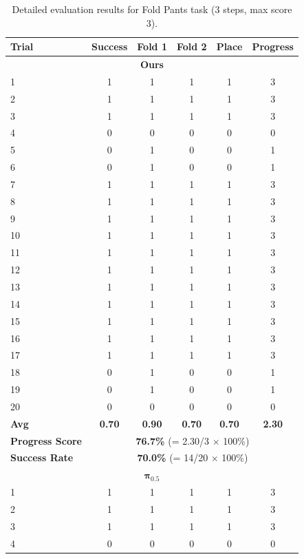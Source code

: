 \documentclass[onecolumn]{robbyant}           %
\begin{document}
\begin{table}[t]
\centering
\caption{Detailed evaluation results for Fold Pants task (3 steps, max score 3).}
\label{tab:realworld_detailed_fold_pants}
\scriptsize
\begin{tabular}{l|c|ccc|c}
\toprule
\textbf{Trial} & \textbf{Success} & \textbf{Fold 1} & \textbf{Fold 2} & \textbf{Place} & \textbf{Progress} \\
\midrule
\multicolumn{6}{c}{\textbf{Ours}} \\
\midrule
1  & 1 & 1 & 1 & 1 & 3 \\
2  & 1 & 1 & 1 & 1 & 3 \\
3  & 1 & 1 & 1 & 1 & 3 \\
4  & 0 & 0 & 0 & 0 & 0 \\
5  & 0 & 1 & 0 & 0 & 1 \\
6  & 0 & 1 & 0 & 0 & 1 \\
7  & 1 & 1 & 1 & 1 & 3 \\
8  & 1 & 1 & 1 & 1 & 3 \\
9  & 1 & 1 & 1 & 1 & 3 \\
10 & 1 & 1 & 1 & 1 & 3 \\
11 & 1 & 1 & 1 & 1 & 3 \\
12 & 1 & 1 & 1 & 1 & 3 \\
13 & 1 & 1 & 1 & 1 & 3 \\
14 & 1 & 1 & 1 & 1 & 3 \\
15 & 1 & 1 & 1 & 1 & 3 \\
16 & 1 & 1 & 1 & 1 & 3 \\
17 & 1 & 1 & 1 & 1 & 3 \\
18 & 0 & 1 & 0 & 0 & 1 \\
19 & 0 & 1 & 0 & 0 & 1 \\
20 & 0 & 0 & 0 & 0 & 0 \\
\midrule
\textbf{Avg} & \textbf{0.70} & \textbf{0.90} & \textbf{0.70} & \textbf{0.70} & \textbf{2.30} \\
\textbf{Progress Score} & \multicolumn{5}{c}{\textbf{76.7\%} (= 2.30/3 $\times$ 100\%)} \\
\textbf{Success Rate} & \multicolumn{5}{c}{\textbf{70.0\%} (= 14/20 $\times$ 100\%)} \\
\midrule
\multicolumn{6}{c}{$\boldsymbol{\pi_{0.5}}$} \\
\midrule
1  & 1 & 1 & 1 & 1 & 3 \\
2  & 1 & 1 & 1 & 1 & 3 \\
3  & 1 & 1 & 1 & 1 & 3 \\
4  & 0 & 0 & 0 & 0 & 0 \\

\end{tabular}
\end{table}
\end{document}
